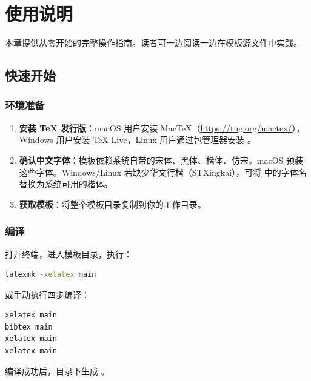 \documentclass[../main-manual.tex]{subfiles}
\begin{document}
\cleardoublepage
\thispagestyle{empty}
 \songti
\setlength{\baselineskip}{24pt}
\RaggedRight
\setlength{\parindent}{2em}
\raggedbottom

\chapter{使用说明} \label{ch:usage}

本章提供从零开始的完整操作指南。读者可一边阅读一边在模板源文件中实践。

\section{快速开始}

\subsection{环境准备}

\begin{enumerate}[label=\textbf{第\arabic*步：}]
	\item \textbf{安装 \TeX{} 发行版}：macOS 用户安装 Mac\TeX{}（\url{https://tug.org/mactex/}），Windows 用户安装 \TeX{} Live，Linux 用户通过包管理器安装 。
	\item \textbf{确认中文字体}：模板依赖系统自带的宋体、黑体、楷体、仿宋。macOS 预装这些字体。Windows/Linux 若缺少华文行楷（STXingkai），可将  中的字体名替换为系统可用的楷体。
	\item \textbf{获取模板}：将整个模板目录复制到你的工作目录。
\end{enumerate}

\subsection{编译}

打开终端，进入模板目录，执行：

\begin{lstlisting}[language=bash, caption={一键编译（推荐）}]
latexmk -xelatex main
\end{lstlisting}

或手动执行四步编译：

\begin{lstlisting}[language=bash, caption={手动编译}]
xelatex main
bibtex main
xelatex main
xelatex main
\end{lstlisting}

编译成功后，目录下生成 。
\end{document}
